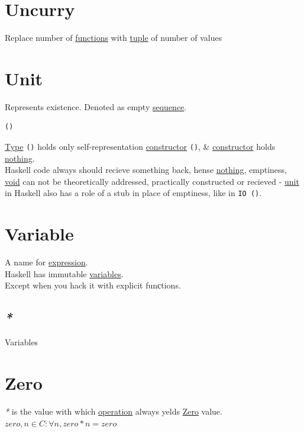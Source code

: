 \documentclass[a4paper,14pt,oneside]{book}
\begin{document}
\chapter{\label{orgfc4114c}Uncurry}
\label{sec:org074b736}
Replace number of \hyperref[org2d0eb2e]{functions} with \hyperref[orgeb2817b]{tuple} of number of values\\

\chapter{\label{orga4edbd5}Unit}
\label{sec:org6e053ac}
Represents existence. Denoted as empty \hyperref[org5895702]{sequence}.\\
\begin{verbatim}
()
\end{verbatim}

\hyperref[orgc4a7610]{Type} \texttt{()} holds only self-representation \hyperref[orgc774841]{constructor} \texttt{()}, \& \hyperref[orgc774841]{constructor} holds \hyperref[org8378560]{nothing}.\\

Haskell code always should recieve something back, hense \hyperref[org8378560]{nothing}, emptiness, \hyperref[orgd2f48f0]{void} can not be theoretically addressed, practically constructed or recieved - \hyperref[orga4edbd5]{unit} in Haskell also has a role of a stub in place of emptiness, like in \texttt{IO ()}.\\

\chapter{\label{orgd43afbd}Variable}
\label{sec:orgdf6feca}
A name for \hyperref[org3ea9088]{expression}.\\

Haskell has immutable \hyperref[org329012b]{variables}.\\
Except when you hack it with explicit funсtions.\\

\section{\emph{*}}
\label{sec:org3e84602}

\label{org329012b}Variables\\

\chapter{\label{org9629e67}Zero}
\label{sec:orgd7a656c}
\emph{*} is the value with which \hyperref[org894d189]{operation} always yelds \hyperref[org9629e67]{Zero} value.\\
\(zero, n \in C : \forall n, zero*n=zero\)\\
\end{document}
